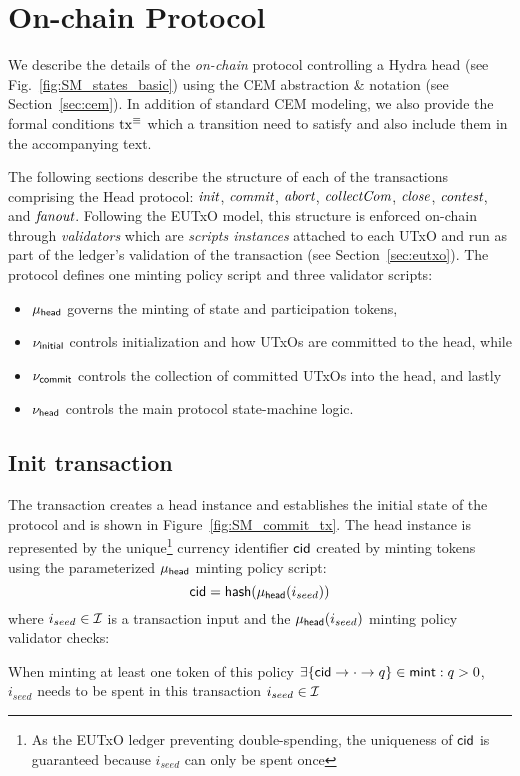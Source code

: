 \section{On-chain Protocol}\label{sec:on-chain}


We describe the details of the \emph{on-chain} protocol controlling a
Hydra head (see Fig.~\ref{fig:SM_states_basic}) using the CEM abstraction \&
notation (see Section~\ref{sec:cem}). In addition of standard CEM modeling, we
also provide the formal conditions $\mathrm{tx}^\equiv$ which a transition need to
satisfy and also include them in the accompanying text.

The following sections describe the structure of each of the transactions
comprising the Head protocol: $\textit{init}{}$, $\textit{commit}{}$, $\textit{abort}{}$,
$\textit{collectCom}{}$, $\textit{close}{}$, $\textit{contest}{}$, and $\textit{fanout}{}$. Following
the EUTxO model, this structure is enforced on-chain through \emph{validators}
which are \emph{scripts instances} attached to each UTxO and run as part of the
ledger's validation of the transaction (see Section~\ref{sec:eutxo}). The
protocol defines one minting policy script and three validator scripts:
\begin{itemize}
  \item $\mu_\mathsf{head}$ governs the minting of state and participation tokens,
  \item $\nu_\mathsf{initial}$ controls initialization and how UTxOs are committed to the head, while
  \item $\nu_\mathsf{commit}$ controls the collection of committed UTxOs into the head, and lastly
  \item $\nu_\mathsf{head}$ controls the main protocol state-machine logic.
\end{itemize}

\subsection{Init transaction}

The \mtxInit{} transaction creates a head instance and establishes the initial
state of the protocol and is shown in Figure~\ref{fig:SM_commit_tx}. The head
instance is represented by the unique\footnote{As the EUTxO ledger preventing
  double-spending, the uniqueness of $\mathsf{cid}$ is guaranteed because $i_{seed}$ can
  only be spent once} currency identifier $\mathsf{cid}$ created by minting tokens using
the parameterized $\mu_\mathsf{head}$ minting policy script:
\[
  \mathsf{cid} = \mathsf{hash}(\mu_\mathsf{head}(i_{seed}))
\]
\noindent where $i_{seed} \in \mathcal{I}$ is a transaction input and the
$\mu_\mathsf{head}(i_{seed})$ minting policy validator checks:
\begin{menumerate}
  \item When minting at least one token of this policy $\exists \{\mathsf{cid} \rightarrow \cdot \rightarrow q\} \in \mathsf{mint} : q > 0$, $i_{seed}$ needs to be spent in this transaction
  $i_{seed} \in \mathcal{I}$
\end{menumerate}

